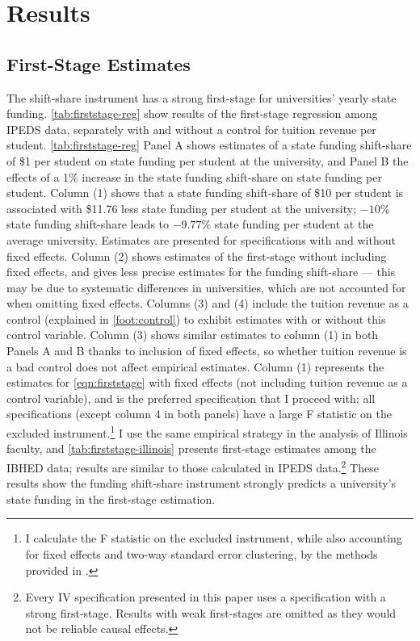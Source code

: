 \section{Results}
\label{sec:results}

\subsection{First-Stage Estimates}
\label{sec:results-firststage}
The shift-share instrument has a strong first-stage for universities' yearly state funding.
\autoref{tab:firststage-reg} show results of the first-stage regression among IPEDS data, separately with and without a control for tuition revenue per student.
\autoref{tab:firststage-reg} Panel A shows estimates of a state funding shift-share of \$1 per student on state funding per student at the university, and Panel B the effects of a 1\% increase in the state funding shift-share on state funding per student.
Column (1) shows that a state funding shift-share of \$10 per student is associated with \$11.76 less state funding per student at the university; $-10$\% state funding shift-share leads to $-9.77$\% state funding per student at the average university.
Estimates are presented for specifications with and without fixed effects.
Column (2) shows estimates of the first-stage without including fixed effects, and gives less precise estimates for the funding shift-share --- this may be due to systematic differences in universities, which are not accounted for when omitting fixed effects.
Columns (3) and (4) include the tuition revenue as a control (explained in \autoref{foot:control}) to exhibit estimates with or without this control variable.
Column (3) shows similar estimates to column (1) in both Panels A and B thanks to inclusion of fixed effects, so whether tuition revenue is a bad control does not affect empirical estimates.
Column (1) represents the estimates for \autoref{eqn:firststage} with fixed effects (not including tuition revenue as a control variable), and is the preferred specification that I proceed with;
all specifications (except column 4 in both panels) have a large F statistic on the excluded instrument.\footnote{
    I calculate the F statistic on the excluded instrument, while also accounting for fixed effects and two-way standard error clustering, by the methods provided in \cite{olea2013robust}.
}
I use the same empirical strategy in the analysis of Illinois faculty, and \autoref{tab:firststage-illinois} presents first-stage estimates among the IBHED data; results are similar to those calculated in IPEDS data.\footnote{
    Every IV specification presented in this paper uses a specification with a strong first-stage.
    Results with weak first-stages are omitted as they would not be reliable causal effects.
}
These results show the funding shift-share instrument strongly predicts a university's state funding in the first-stage estimation.


